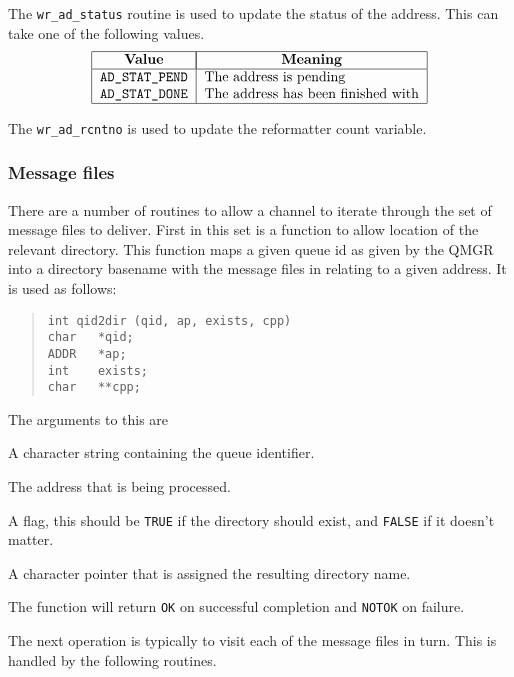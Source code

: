 The \verb|wr_ad_status| routine is used to update the status of the address.
This can take one of the following values.
\[\begin{tabular}{|l|l|}
\hline
	\multicolumn{1}{|c|}{\bf Value}&
		\multicolumn{1}{|c|}{\bf Meaning}\\
\hline
	\tt AD\_STAT\_PEND&	The address is pending\\
	\tt AD\_STAT\_DONE&	The address has been finished with\\
\hline
\end{tabular}\]


The \verb|wr_ad_rcntno| is used to update the reformatter count variable.

\subsubsection{Message files}

There are a number of routines to allow a channel to iterate through
the set of message files to deliver. First in this set is a function
to allow location of the relevant directory. This function maps a
given queue id as given by the QMGR into a directory basename with the
message files in relating to a given address. It is
used as follows:
\begin{quote}\begin{verbatim}
int qid2dir (qid, ap, exists, cpp)
char   *qid;
ADDR   *ap;
int    exists;
char   **cpp;
\end{verbatim}\end{quote}
The arguments to this are
\begin{describe}
\item[\verb|qid|:]	A character string containing the queue identifier.

\item[\verb|ap|:]	The address that is being processed.

\item[\verb|exists|:]	A flag, this should be \verb|TRUE| if the directory
should exist, and \verb|FALSE| if it doesn't matter.

\item[\verb|cpp|:]	A character pointer that is assigned the
resulting directory name.
\end{describe}

The function will return \verb|OK| on successful completion and
\verb|NOTOK| on failure.

The next operation is typically to visit each of the message files in
turn. This is handled by the following routines.

